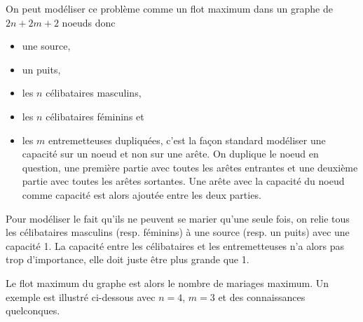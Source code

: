 \begin{solution}
  On peut modéliser ce problème comme un flot maximum dans un graphe de $2n + 2m + 2$ noeuds donc
  \begin{itemize}
    \item une source,
    \item un puits,
    \item les $n$ célibataires masculins,
    \item les $n$ célibataires féminins et
    \item les $m$ entremetteuses dupliquées,
      c'est la façon standard modéliser une capacité sur un noeud et non sur une arête.
      On duplique le noeud en question, une première partie avec toutes les arêtes entrantes
      et une deuxième partie avec toutes les arêtes sortantes.
      Une arête avec la capacité du noeud comme capacité est alors ajoutée entre les deux parties.
  \end{itemize}
  Pour modéliser le fait qu'ils ne peuvent se marier qu'une seule fois, on relie tous les célibataires
  masculins (resp. féminins) à une source (resp. un puits) avec une capacité 1.
  La capacité entre les célibataires et les entremetteuses n'a alors pas trop d'importance,
  elle doit juste être plus grande que 1.

  Le flot maximum du graphe est alors le nombre de mariages maximum.
  Un exemple est illustré ci-dessous avec $n = 4$, $m = 3$ et des connaissances quelconques.
  \begin{center}
  \end{center}
\end{solution}

